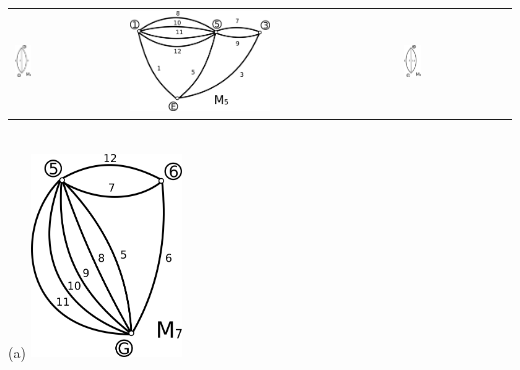\documentclass[11pt]{amsbook}
\begin{document}
\begin{tabular}{ l l l }
 \includegraphics[width=0.16\textwidth]{images/ceyhun-167-fig04}&\includegraphics[width=0.54\textwidth]{images/ceyhun-167-fig05} &\includegraphics[width=0.16\textwidth]{images/ceyhun-167-fig06} \\
\end{tabular}
\\
(a) \quad\quad\quad\quad
\includegraphics[width=0.3\textwidth]{images/ceyhun-167-fig07}
\end{document}
